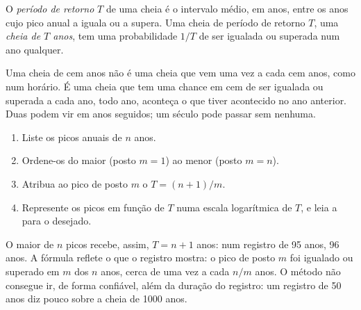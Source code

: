 \begin{definition}\label{def:g10:drainage-basins:return-period}
O \emph{período de retorno} $T$
de uma cheia é o intervalo médio, em anos, entre os anos cujo pico anual a
iguala ou a supera. Uma cheia de período de retorno $T$, uma \emph{cheia de
$T$ anos}, tem uma probabilidade $1/T$ de ser igualada ou superada num ano
qualquer.
\end{definition}

Uma cheia de cem anos não é uma cheia que vem uma vez a cada cem anos, como
num horário. É uma cheia que tem uma chance em cem de ser igualada ou
superada a cada ano, todo ano, aconteça o que tiver acontecido no ano
anterior. Duas podem vir em anos seguidos; um século pode passar sem
nenhuma.

\begin{method}\label{met:g10:drainage-basins:return-periods}
\begin{enumerate}
  \item Liste os picos anuais de $n$ anos.
  \item Ordene-os do maior (posto $m = 1$) ao menor (posto $m = n$).
  \item Atribua ao pico de posto $m$ o  $T = (n + 1)/m$.
  \item Represente os picos em função de $T$ numa escala logarítmica de $T$,
        e leia a  para o  desejado.
\end{enumerate}
\end{method}

O maior de $n$ picos recebe, assim, $T = n + 1$ anos: num registro de
\num{95} anos, \num{96} anos. A fórmula reflete o que o registro mostra: o
pico de posto $m$ foi igualado ou superado em $m$ dos $n$ anos, cerca de uma
vez a cada $n/m$ anos. O método não consegue ir, de forma confiável, além da
duração do registro: um registro de \num{50} anos diz pouco sobre a cheia de
\num{1000} anos.

